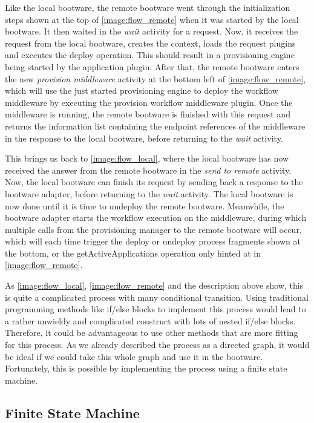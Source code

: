 Like the local bootware, the remote bootware went through the initialization steps shown at the top of \autoref{image:flow_remote} when it was started by the local bootware.
It then waited in the \textit{wait} activity for a request.
Now, it receives the request from the local bootware, creates the context, loads the request plugins and executes the deploy operation.
This should result in a provisioning engine being started by the application plugin.
After that, the remote bootware enters the new \textit{provision middleware} activity at the bottom left of \autoref{image:flow_remote}, which will use the just started provisioning engine to deploy the workflow middleware by executing the provision workflow middleware plugin.
Once the middleware is running, the remote bootware is finished with this request and returns the information list containing the endpoint references of the middleware in the response to the local bootware, before returning to the \textit{wait} activity.

This brings us back to \autoref{image:flow_local}, where the local bootware has now received the answer from the remote bootware in the \textit{send to remote} activity.
Now, the local bootware can finish its request by sending back a response to the bootware adapter, before returning to the \textit{wait} activity.
The local bootware is now done until it is time to undeploy the remote bootware.
Meanwhile, the bootware adapter starts the workflow execution on the middleware, during which multiple calls from the provisioning manager to the remote bootware will occur, which will each time trigger the deploy or undeploy process fragments shown at the bottom, or the getActiveApplications operation only hinted at in \autoref{image:flow_remote}.

As \autoref{image:flow_local}, \autoref{image:flow_remote} and the description above show, this is quite a complicated process with many conditional transition.
Using traditional programming methods like if/else blocks to implement this process would lead to a rather unwieldy and complicated construct with lots of nested if/else blocks.
Therefore, it could be advantageous to use other methods that are more fitting for this process.
As we already described the process as a directed graph, it would be ideal if we could take this whole graph and use it in the bootware.
Fortunately, this is possible by implementing the process using a finite state machine.

\subsection{Finite State Machine}

